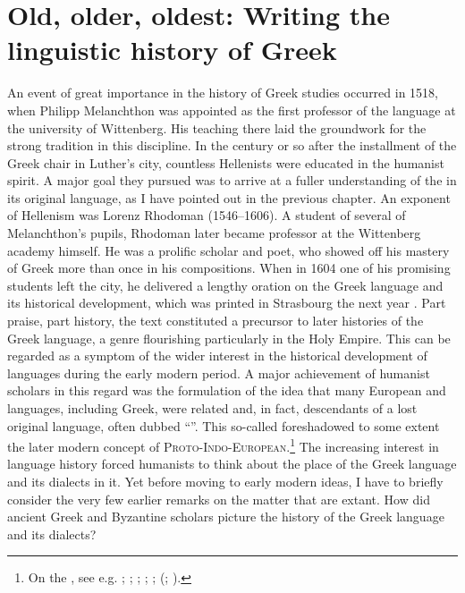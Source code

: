 \chapter{Old, older, oldest: Writing the linguistic history of Greek}\label{chap:5}

An event of great importance in the history of Greek studies occurred in 1518, when Philipp Melanchthon was appointed as the first professor of the language at the university of Wittenberg. His teaching there laid the groundwork for the strong  tradition in this discipline. In the century or so after the installment of the Greek chair in Luther’s city, countless Hellenists were educated in the humanist spirit. A major goal they pursued was to arrive at a fuller understanding of the  in its original language, as I have pointed out in the previous chapter. An exponent of  Hellenism was Lorenz Rhodoman (1546–1606). A student of several of Melanchthon’s pupils, Rhodoman later became professor at the Wittenberg academy himself. He was a prolific scholar and poet, who showed off his mastery of Greek more than once in his compositions. When in 1604 one of his promising students left the city, he delivered a lengthy oration on the Greek language and its historical development, which was printed in Strasbourg the next year \citep{Rhodomanus1605}. Part praise, part history, the text constituted a precursor to later histories of the Greek language, a genre flourishing particularly in the Holy  Empire. This can be regarded as a symptom of the wider interest in the historical development of languages during the early modern period. A major achievement of humanist scholars in this regard was the formulation of the idea that many European and  languages, including Greek, were related and, in fact, descendants of a lost original language, often dubbed “”. This so-called  foreshadowed to some extent the later modern concept of \textsc{Proto-Indo-European}.\footnote{On the , see e.g. \citet[34--39]{Metcalf2013}; \citet{Droixhe1980}; \citet[]{Swiggers1984, Swiggers1998}; \citet{Villani2003}; \citet{Considine2010}; \citeauthor{VanHal2010b} (\citeyear{VanHal2010b}; \citeyear[esp. 335–401, 473–475]{VanHal2010a}).} The increasing interest in language history forced humanists to think about the place of the Greek language and its dialects in it. Yet before moving to early modern ideas, I have to briefly consider the very few earlier remarks on the matter that are extant. How did ancient Greek and Byzantine scholars picture the history of the Greek language and its dialects?

